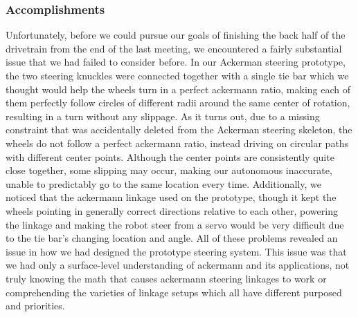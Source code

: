 \subsubsection*{Accomplishments}
Unfortunately, before we could pursue our goals of finishing the back half of the drivetrain from the end of the last meeting, we encountered a fairly substantial issue that we had failed to consider before. In our Ackerman steering prototype, the two steering knuckles were connected together with a single tie bar which we thought would help the wheels turn in a perfect ackermann ratio, making each of them perfectly follow circles of different radii around the same center of rotation, resulting in a turn without any slippage. As it turns out, due to a missing constraint that was accidentally deleted from the Ackerman steering skeleton, the wheels do not follow a perfect ackermann ratio, instead driving on circular paths with different center points. Although the center points are consistently quite close together, some slipping may occur, making our autonomous inaccurate, unable to predictably go to the same location every time. Additionally, we noticed that the ackermann linkage used on the prototype, though it kept the wheels pointing in generally correct directions relative to each other, powering the linkage and making the robot steer from a servo would be very difficult due to the tie bar’s changing location and angle. All of these problems revealed an issue in how we had designed the prototype steering system. This issue was that we had only a surface-level understanding of ackermann and its applications, not truly knowing the math that causes ackermann steering linkages to work or comprehending the varieties of linkage setups which all have different purposed and priorities. 

